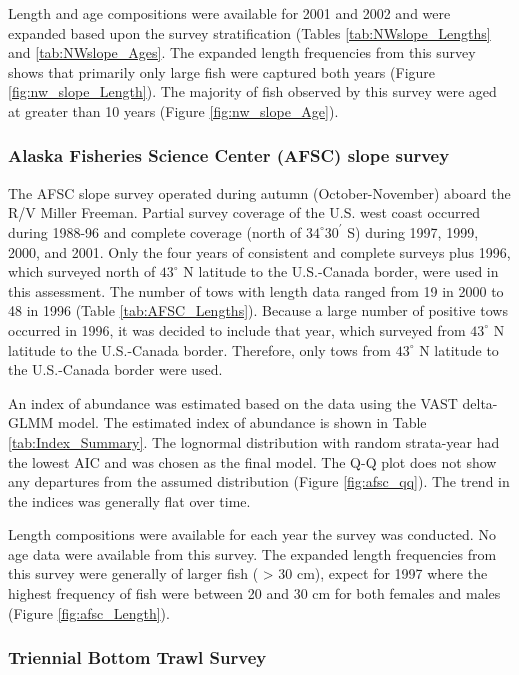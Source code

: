 \documentclass[12pt,]{article}
\begin{document}
Length and age compositions were available for 2001 and 2002 and were
expanded based upon the survey stratification (Tables
\ref{tab:NWslope_Lengths} and \ref{tab:NWslope_Ages}. The expanded
length frequencies from this survey shows that primarily only large fish
were captured both years (Figure \ref{fig:nw_slope_Length}). The
majority of fish observed by this survey were aged at greater than 10
years (Figure \ref{fig:nw_slope_Age}).

\subsubsection{Alaska Fisheries Science Center (AFSC) slope
survey}\label{alaska-fisheries-science-center-afsc-slope-survey}

The AFSC slope survey operated during autumn (October-November) aboard
the R/V Miller Freeman. Partial survey coverage of the U.S. west coast
occurred during 1988-96 and complete coverage (north of
\(34^\circ 30^\prime\) S) during 1997, 1999, 2000, and 2001. Only the
four years of consistent and complete surveys plus 1996, which surveyed
north of \(43^\circ\) N latitude to the U.S.-Canada border, were used in
this assessment. The number of tows with length data ranged from 19 in
2000 to 48 in 1996 (Table \ref{tab:AFSC_Lengths}). Because a large
number of positive tows occurred in 1996, it was decided to include that
year, which surveyed from \(43^\circ\) N latitude to the U.S.-Canada
border. Therefore, only tows from \(43^\circ\) N latitude to the
U.S.-Canada border were used.

An index of abundance was estimated based on the data using the VAST
delta-GLMM model. The estimated index of abundance is shown in Table
\ref{tab:Index_Summary}. The lognormal distribution with random
strata-year had the lowest AIC and was chosen as the final model. The
Q-Q plot does not show any departures from the assumed distribution
(Figure \ref{fig:afsc_qq}). The trend in the indices was generally flat
over time.

Length compositions were available for each year the survey was
conducted. No age data were available from this survey. The expanded
length frequencies from this survey were generally of larger fish (
\textgreater{} 30 cm), expect for 1997 where the highest frequency of
fish were between 20 and 30 cm for both females and males (Figure
\ref{fig:afsc_Length}).

\subsubsection{Triennial Bottom Trawl
Survey}\label{triennial-bottom-trawl-survey}
\end{document}
